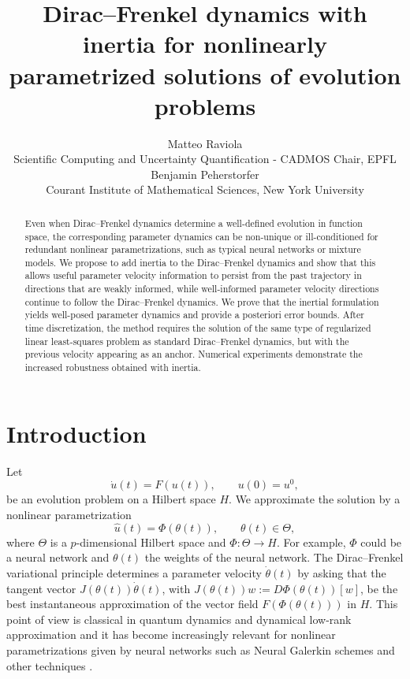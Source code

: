 \documentclass[oneside,11pt]{article}
\title{Dirac--Frenkel dynamics with inertia for nonlinearly parametrized solutions of evolution problems}
\author{%
  \name Matteo Raviola \\
  \addr Scientific Computing and Uncertainty Quantification - CADMOS Chair, EPFL\\
  \AND
  Benjamin Peherstorfer\\
   \addr Courant Institute of Mathematical Sciences, New York University\\
}
\theoremstyle{remark}
\theoremstyle{thmstyleone}
\theoremstyle{thmstylethree}
\theoremstyle{thmstyletwo}
\begin{document}
\maketitle
\begin{abstract}
Even when Dirac--Frenkel dynamics determine a well-defined evolution in function space, the corresponding parameter dynamics can be non-unique or ill-conditioned for redundant nonlinear parametrizations, such as typical neural networks or mixture models. We propose to add inertia to the Dirac--Frenkel dynamics and show that this allows useful parameter velocity information to persist from the past trajectory in directions that are weakly informed, while well-informed parameter velocity directions continue to follow the Dirac--Frenkel dynamics. We prove that the inertial formulation yields well-posed parameter dynamics and provide a posteriori error bounds. After time discretization, the method requires the solution of the same type of regularized linear least-squares problem as standard Dirac--Frenkel dynamics, but with the previous velocity appearing as an anchor. Numerical experiments demonstrate the increased robustness obtained with inertia.
\end{abstract}

\section{Introduction}
Let
\begin{equation}
      \dot u(t)=F(u(t)),
      \qquad u(0)=u^0,
      \label{eq:ode_intro}
\end{equation}
be an evolution problem on a Hilbert space $H$. We approximate the solution by a
nonlinear parametrization
\begin{equation}
      \hat u(t)=\Phi(\theta(t)),
      \qquad \theta(t)\in \Theta,
      \label{eq:param_intro}
\end{equation}
where $\Theta$ is a $p$-dimensional Hilbert space and $\Phi:\Theta\to H$. For example, $\Phi$ could be a neural network and $\theta(t)$ the weights of the neural network. The Dirac--Frenkel variational principle determines a parameter velocity $\dot{\theta}(t)$ by asking
that the tangent vector $J(\theta(t))\dot\theta(t)$, with $J(\theta(t))w:=D\Phi(\theta(t))[w]$, be the best instantaneous
approximation of the vector field $F(\Phi(\theta(t)))$ in $H$.
This point of view is classical in quantum dynamics and dynamical low-rank
approximation \cite{Dirac1930,Frenkel1934,Lubich2008,KochLubich2007,Haegeman2011} and it has become increasingly relevant for nonlinear
parametrizations given by neural networks such as Neural Galerkin schemes \cite{bruna_neural_2024} and other techniques \cite{PhysRevE.104.045303,anderson2021evolution,wang2021particle,doi:10.1137/22M1529427,finzi_stable_2023,Feischl2024,lubich2025regularizeddynamicalparametricapproximation,10.1051proc202581002,KAST2024112986,24OTDDTO,dahmen2025expansivenaturalneuralgradient,bon2025stablenonlineardynamicalapproximation,hesthaven2026nonlinearmodelreductiontransportdominated}.
\end{document}

